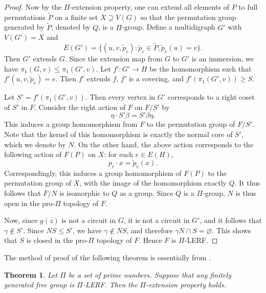 \documentclass[10pt,a4paper]{amsart}
\newtheorem{theorem}{Theorem}[section]
\theoremstyle{definition}
\theoremstyle{definition}
\numberwithin{equation}{section}
\begin{document}
\begin{proof}
Now by the $\Pi$-extension property, one can extend all elements of $P$ to full permutations $\tilde{P}$ on a finite set $X\supseteq V(G)$ so that the permutation group generated by $\tilde{P}$, denoted by $Q$, is a $\Pi$-group. Define a multidigraph $G'$ with $V(G')=X$ and
$$ E(G')=\{(u,v,\tilde{p}_e)\colon \tilde{p}_e\in \tilde{P}, \tilde{p}_e(u)=v\}. $$
Then $G'$ extends $G$. Since the extension map from $G$ to $G'$ is an immersion, we have $\pi_1(G, v)\leq \pi_1(G',v)$. Let $f'\colon G'\to H$ be the homomorphism such that $f'(u,v,\tilde{p}_e)=e$. Then $f'$ extends $f$, $f'$ is a covering, and $f'(\pi_1(G',v))\geq S$. 

Let $S'=f'(\pi_1(G', v))$. Then every vertex in $G'$ corresponds to a right coset of $S'$ in $F$. Consider the right action of $F$ on $F/S'$ by 
$$ \eta\cdot S'\beta=S'\beta\eta. $$
This induces a group homomorphism from $F$ to the permutation group of $F/S'$. Note that the kernel of this homomorphism is exactly the normal core of $S'$, which we denote by $N$. 
On the other hand, the above action corresponds to the following action of $F(P)$ on $X$: for each $e\in E(H)$, 
$$ p_e\cdot x=\tilde{p}_e(x). $$
Correspondingly, this induces a group homomorphism of $F(P)$ to the permutation group of $X$, with the image of the homomorphism exactly $Q$. It thus follows that $F/N$ is isomorphic to $Q$ as a group. Since $Q$ is a $\Pi$-group, $N$ is thus open in the pro-$\Pi$ topology of $F$. 

Now, since $g(z)$ is not a circuit in $G$, it is not a circuit in $G'$, and it follows that $\gamma\not\in S'$. Since $NS\leq S'$, we have $\gamma\not\in NS$, and therefore $\gamma N\cap S=\varnothing$. This shows that $S$ is closed in the pro-$\Pi$ topology of $F$. Hence $F$ is $\Pi$-LERF.
\end{proof}

The method of proof of the following theorem is essentially from \cite{HL00}.

\begin{theorem}\label{thm:LERF2EP} Let $\Pi$ be a set of prime numbers. Suppose that any finitely generated free group is $\Pi$-LERF. Then the $\Pi$-extension property holds.
\end{theorem}
\end{document}
